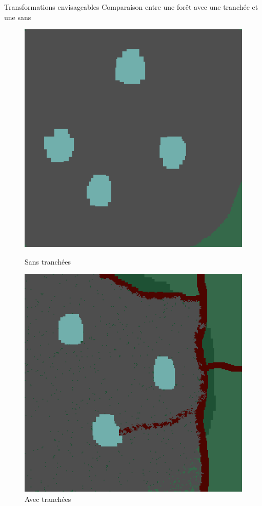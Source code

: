 \documentclass{beamer}
\begin{document}
\begin{frame}{Transformations envisageables \hyperlink{jump}{\beamerbutton{ }} \hypertarget{14}{\beamerbutton{ }}}
    Comparaison entre une forêt avec une tranchée et une sans
    
    \begin{figure}[!htb]
        \begin{minipage}{0.48\textwidth}
          \centering
          \includegraphics[width=.8\linewidth]{pictures/trans/no_treach.png}
          \caption{Sans tranchées}\label{Fig:Data1}
        \end{minipage}\hfill
        \begin{minipage}{0.48\textwidth}
          \centering
          \includegraphics[width=.8\linewidth]{pictures/trans/treach.png}
          \caption{Avec tranchées}\label{Fig:Data2}
        \end{minipage}
     \end{figure}
\end{frame}
\end{document}
